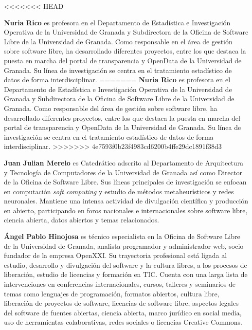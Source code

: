 \documentclass[10pt,twoside,spanish]{article}
\numberwithin{equation}{section}
\begin{document}
<<<<<<< HEAD

\textbf{Nuria Rico} es profesora en el Departamento de Estadística e Investigación Operativa de la Universidad de Granada y Subdirectora de la Oficina de Software Libre de la Universidad de Granada. Como responsable en el área de gestión sobre software libre, ha desarrollado diferentes proyectos, entre los que destaca la puesta en marcha del portal de transparencia y OpenData de la Universidad de Granada. Su línea de investigación se centra en el tratamiento estadístico de datos de forma interdisciplinar.
=======
\textbf{Nuria Rico} es profesora en el Departamento de Estadística e Investigación Operativa de la Universidad de Granada y Subdirectora de la Oficina de Software Libre de la Universidad de Granada. Como responsable del área de gestión sobre software libre, ha desarrollado diferentes proyectos, entre los que destaca la puesta en marcha del portal de transparencia y OpenData de la Universidad de Granada. Su línea de investigación se centra en el tratamiento estadístico de datos de forma interdisciplinar.
>>>>>>> 4e7593f0b23f4983cd6200b4ffe29dc1891f38d3

\textbf{Juan Julian Merelo} es Catedrático  adscrito al Departamento de Arquitectura y Tecnología de Computadores de la Universidad de Granada así como Director de la Oficina de Software Libre. Sus líneas principales de investigación se enfocan en computación {\em soft computing} y estudio de métodos metaheurísticos y redes neuronales. Mantiene una intensa actividad de divulgación científica y producción en abierto, participando en foros nacionales e internacionales sobre software libre, ciencia abierta, datos abiertos y temas relacionados.

\textbf{Ángel Pablo Hinojosa} es técnico especialista en la Oficina de Software Libre de la Universidad de Granada, analista programador y administrador web, socio fundador de la empresa OpenXXI. Su trayectoria profesional está ligada al estudio, desarrollo y divulgación del software y la cultura libres, a los procesos de liberación, estudio de licencias y formación en TIC. Cuenta con una larga lista de intervenciones en conferencias internacionales, cursos, talleres y seminarios de temas como lenguajes de programación, formatos abiertos, cultura libre, liberación de proyectos de software, licencias de software libre, aspectos legales del software de fuentes abiertas, ciencia abierta, marco jurídico en social media, uso de herramientas colaborativas, redes sociales o licencias Creative Commons.
\end{document}
